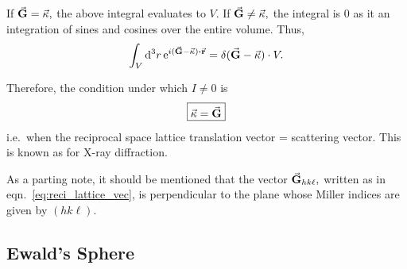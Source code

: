 	If $\va{G} = \va{\kappa},$ the above integral evaluates to $V.$ If $\va{G} \ne \va{\kappa},$ the integral is $0$ as it an integration of sines and cosines over the entire volume. Thus,%
%	
	\begin{equation}
	\int_V \dd[3]{r} \e{ i (\va{G} - \va{\kappa}) \vdot \va{r} } = \delta ( \va{G} - \va{\kappa} ) \cdot V.
	\end{equation}
	
	Therefore, the condition under which $I \ne 0$ is%
%	
	\begin{equation}
	\boxed{\va{\kappa} = \va{G}}
	\end{equation}%
%	
	i.e.\ when the reciprocal space lattice translation vector = scattering vector. This is known as  for X-ray diffraction.
	
	As a parting note, it should be mentioned that the vector $\va{G}_{hk\ell},$ written as in eqn.~\eqref{eq:reci_lattice_vec}, is perpendicular to the plane whose Miller indices are given by $(h k \ell).$
		

\subsection{Ewald's Sphere}
	
